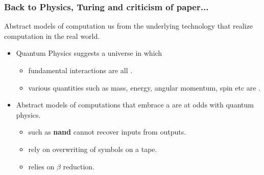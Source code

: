 \documentclass[svgnames,11pt]{beamer}
\newcommand{\red}[1]{{\color{red}{#1}}}
\newcommand{\lcal}{\ensuremath{\lambda}-calculus\xspace}
\begin{document}
\begin{frame}
\frametitle{Back to Physics, Turing and criticism of paper... }


\begin{block}

Abstract models of computation \red{shield} us from the underlying
technology that realize computation in the real world.  
\end{block}



\pause
\vfill
  \begin{itemize}

  \item Quantum Physics suggests a universe in which

    \begin{itemize}
    \item fundamental interactions are all \red{reversible}.
    \item various quantities such as mass, energy, angular momentum,
      spin etc are \red{conserved}.
    \end{itemize}


\pause
\vfill
\item Abstract models of computations that embrace a \red{irreversible
    classical worldview} are at odds with quantum physics.

    \begin{itemize}


\vfill
    \item \red{Logic gates} such as \textbf{nand} cannot recover inputs from outputs.


\vfill
\item \red{Turing machines} rely on overwriting of symbols on a tape.

\vfill
\item \red{\lcal} relies on $\beta$ reduction.

    \end{itemize}

  \end{itemize}

\vfill

\end{frame}



\begin{frame}
  
    \begin{center}
    \end{center}


\end{frame}
\end{document}
